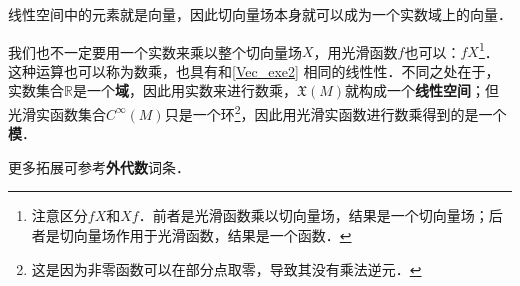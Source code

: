 线性空间中的元素就是向量，因此切向量场本身就可以成为一个实数域上的向量．

我们也不一定要用一个实数来乘以整个切向量场$X$，用光滑函数$f$也可以：$fX$\footnote{注意区分$fX$和$Xf$．前者是光滑函数乘以切向量场，结果是一个切向量场；后者是切向量场作用于光滑函数，结果是一个函数．}．这种运算也可以称为数乘，也具有和\autoref{Vec_exe2} 相同的线性性．不同之处在于，实数集合$\mathbb{R}$是一个\textbf{域}，因此用实数来进行数乘，$\mathfrak{X}(M)$就构成一个\textbf{线性空间}；但光滑实函数集合$C^\infty(M)$只是一个环\footnote{这是因为非零函数可以在部分点取零，导致其没有乘法逆元．}，因此用光滑实函数进行数乘得到的是一个\textbf{模}．

更多拓展可参考\textbf{外代数}词条．



